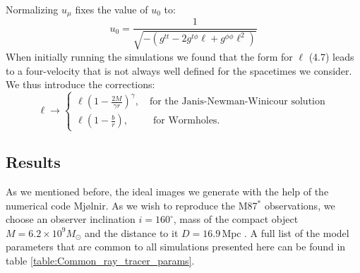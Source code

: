 \documentclass[12pt]{article}
\numberwithin{equation}{section}
\numberwithin{figure}{section}
\begin{document}
	Normalizing $u_\mu$ fixes the value of $u_0$ to:
	\begin{equation}
		u_0 = \frac{1}{\sqrt{-(g^{tt} - 2g^{t\phi}\ell + g^{\phi\phi}\ell^2)}}
	\end{equation}
	When initially running the simulations we found that the form for $\ell$ (4.7) leads to a four-velocity that is not always well defined for the spacetimes we consider. We thus introduce the corrections:
	\begin{equation}
		\ell\rightarrow\begin{cases}
			\ell \left(1 - \frac{2M}{\gamma r}\right)^{\gamma}, \quad\text{for the Janis-Newman-Winicour solution}\\
			\ell \left(1 - \frac{b}{r}\right), \,\,\,\qquad\text{for Wormholes}.
		\end{cases}
	\end{equation}
	
	\subsection{Results}
	
	As we mentioned before, the ideal images we generate with the help of the numerical code Mjølnir. As we wish to reproduce the M87$^*$ observations, we choose an observer inclination $i = 160^\circ$, mass of the compact object $M = 6.2\times 10^9M_\odot$ and the distance to it $D = 16.9\, \text{Mpc}$ \cite{EHT_M87_I}. A full list of the model parameters that are common to all simulations presented here can be found in table \ref{table:Common_ray_tracer_params}.\\
	
\end{document}
